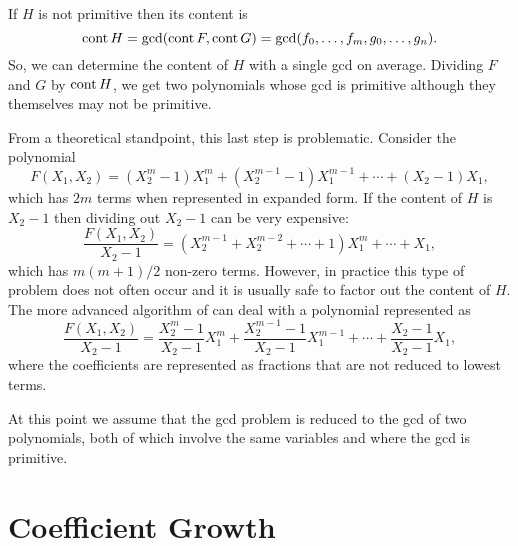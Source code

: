 If $H$ is not primitive then its content is
\[
\operatorname{cont} H = \gcd(\operatorname{cont} F, \operatorname{cont} G) = \gcd(f_0, \ldots, f_m, g_0, \ldots,
g_n).
\]
So, we can determine the content of $H$ with a single {\sc gcd} on
average.  Dividing $F$ and $G$ by $\operatorname{cont} H$, we get two polynomials
whose {\sc gcd} is primitive although they themselves may not be
primitive.

From a theoretical standpoint, this last step is problematic.
Consider the polynomial
\[
F(X_1, X_2) = (X_2^m - 1) X_1^m + (X_2^{m-1} - 1) X_1^{m-1} + 
 \cdots + (X_2 - 1) X_1,
\]
which has $2m$ terms when represented in expanded form.  If the
content of $H$ is $X_2 - 1$ then dividing out $X_2 - 1$ can be very
expensive:
\[
\frac{F(X_1, X_2)}{X_2 -1} = 
(X_2^{m-1} + X_2^{m-2} + \cdots + 1)X_1^m + \cdots + X_1,
\]
which has $m(m+1)/2$ non-zero terms.  However, in practice this type
of problem does not often occur and it is usually safe to factor out
the content of $H$.  The more advanced algorithm of
 can deal with a polynomial represented as
\[
\frac{F(X_1, X_2)}{X_2 - 1} = 
\frac{X_2^m - 1}{X_2 -1} X_1^m + \frac{X_2^{m-1} - 1}{X_2 - 1} X_1^{m-1} + 
 \cdots + \frac{X_2 - 1}{X_2 -1} X_1,
\]
where the coefficients are represented as fractions that are not
reduced to lowest terms.

\medskip
At this point we assume that the {\sc gcd} problem is reduced to the
{\sc gcd} of two polynomials, both of which involve the same variables
and where the {\sc gcd} is primitive.

\section{Coefficient Growth}
\label{PRS:Growth:Sec}

